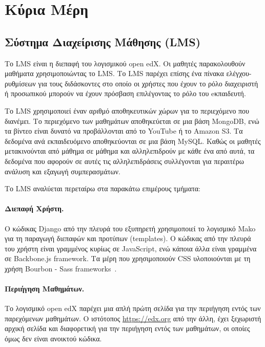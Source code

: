 \documentclass[12pt]{report}
\begin{document}
\section{Κύρια Μέρη}
\subsection{Σύστημα Διαχείρισης Μάθησης (\textlatin{LMS})}\label{lms}
Το \textlatin{LMS} είναι η διεπαφή του λογισμικού \textlatin{open edX}. Οι μαθητές παρακολουθούν μαθήματα χρησιμοποιώντας το \textlatin{LMS}. Το \textlatin{LMS} παρέχει επίσης ένα πίνακα ελέγχου-ρυθμίσεων για τους διδάσκοντες στο οποίο οι χρήστες που έχουν το ρόλο διαχειριστή ή προσωπικού μπορούν να έχουν πρόσβαση επιλέγοντας το ρόλο του eκπαιδευτή.

Το \textlatin{LMS} χρησιμοποιεί έναν αριθμό αποθηκευτικών χώρων για το περιεχόμενο που διανέμει. Το περιεχόμενο των μαθημάτων αποθηκεύεται σε μια βάση \textlatin{MongoDB}, ενώ τα βίντεο είναι δυνατό να προβάλλονται από το \textlatin{YouTube} ή το \textlatin{Amazon S3}. Τα δεδομένα ανά εκπαιδευόμενο αποθηκεύονται σε μια βάση \textlatin{MySQL}. Καθώς οι μαθητές μετακινούνται από μάθημα σε μάθημα και αλληλεπιδρούν με κάθε ένα από αυτά, τα δεδομένα που αφορούν σε αυτές τις αλληλεπιδράσεις συλλέγονται για περαιτέρω ανάλυση και εξαγωγή συμπερασμάτων.

Το \textlatin{LMS} αναλύεται περεταίρω στα παρακάτω επιμέρους τμήματα:
 \paragraph{Διεπαφή Χρήστη.} Ο κώδικας \textlatin{Django} από την πλευρά του εξυπηρετή χρησιμοποιεί το λογισμικό \textlatin{Mako} για τη παραγωγή διεπαφών και προτύπων (\textlatin{templates}). Ο κώδικας από την πλευρά του χρήστη είναι γραμμένος κυρίως σε \textlatin{JavaScript}, ενώ κάποια άλλα είναι γραμμένα σε \textlatin{Backbone.js framework}. Τα μέρη που χρησιμοποιούν \textlatin{CSS} υλοποιούνται με τη χρήση \textlatin{Bourbon - Sass frameworks}~\cite{edx_arch}.
 \paragraph{Περιήγηση Mαθημάτων.} Το λογισμικό \textlatin{open edX} παρέχει μια απλή πρώτη σελίδα για την περιήγηση εντός των παρεχόμενων μαθημάτων. Ο ιστότοπος \textlatin{\url{https://edx.org}} από την άλλη, έχει ξεχωριστή αρχική σελίδα και διαφορετική για την περιήγηση εντός των μαθημάτων, οι οποίες όμως δεν είναι ανοικτού κώδικα.
\end{document}
